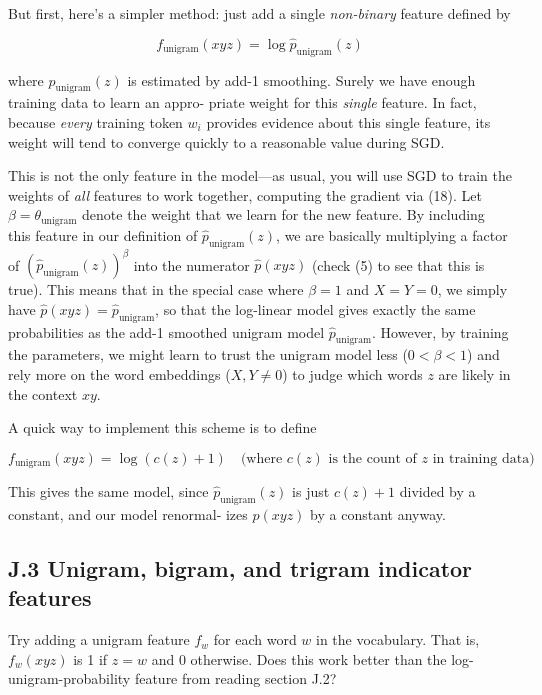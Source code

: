 But first, here’s a simpler method: just add a single \emph{non-binary} feature defined by 

\[
f_{\text{unigram}}(xyz) = \log \hat{p}_{\text{unigram}}(z) \tag{26}
\]

where $\hat{p}_{\text{unigram}}(z)$ is estimated by add-1 smoothing. Surely we have enough training data to learn an appro-
priate weight for this \emph{single} feature. In fact, because \emph{every} training token $w_i$ provides evidence about this 
single feature, its weight will tend to converge quickly to a reasonable value during SGD. 

This is not the only feature in the model—as usual, you will use SGD to train the weights of \emph{all} features 
to work together, computing the gradient via (18). Let $\beta = \theta_{\text{unigram}}$ denote the weight that we learn for 
the new feature. By including this feature in our definition of $\hat{p}_{\text{unigram}}(z)$, we are basically multiplying a 
factor of $(\hat{p}_{\text{unigram}}(z))^\beta$ into the numerator $\hat{p}(xyz)$ (check (5) to see that this is true). This means that in the 
special case where $\beta = 1$ and $X = Y = 0$, we simply have $\hat{p}(xyz) = \hat{p}_{\text{unigram}}$, so that the log-linear model 
gives exactly the same probabilities as the add-1 smoothed unigram model $\hat{p}_{\text{unigram}}$. However, by training 
the parameters, we might learn to trust the unigram model less ($0 < \beta < 1$) and rely more on the word 
embeddings ($X, Y \neq 0$) to judge which words $z$ are likely in the context $xy$. 

A quick way to implement this scheme is to define 

\[
f_{\text{unigram}}(xyz) = \log(c(z) + 1) \quad \text{(where $c(z)$ is the count of $z$ in training data)} \tag{27}
\]

This gives the same model, since $\hat{p}_{\text{unigram}}(z)$ is just $c(z)+1$ divided by a constant, and our model renormal-
izes $\hat{p}(xyz)$ by a constant anyway. 

\subsection*{J.3 Unigram, bigram, and trigram indicator features}

Try adding a unigram feature $f_w$ for each word $w$ in the vocabulary. That is, $f_w(xyz)$ is 1 if $z=w$ and 0 
otherwise. Does this work better than the log-unigram-probability feature from reading section J.2? 

